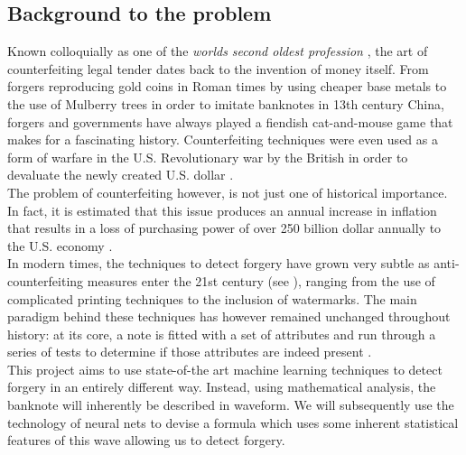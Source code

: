\documentclass[14pt]{article}
\theoremstyle{plain}
\theoremstyle{definition}
\begin{document}
\subsection{Background to the problem}
Known  colloquially as one of the \emph{worlds second oldest profession} \cite{wikiprof}, the art of counterfeiting legal tender dates back to the invention of money itself. From forgers reproducing gold coins in Roman times by using cheaper base metals \cite{wikiforge} to the use of Mulberry trees \cite{wikiforge} in order to imitate banknotes in 13th century China, forgers and governments have always played a fiendish cat-and-mouse game that makes for a fascinating history. Counterfeiting techniques were even used as a form of warfare in the U.S. Revolutionary war by the British in order to devaluate the newly created U.S. dollar \cite{wikiforge}.\\
The problem of counterfeiting however, is not just one of historical importance. In fact, it is estimated that this issue produces an annual increase in inflation that results in a loss of purchasing power of over 250 billion dollar annually to the U.S. economy \cite{usforge}.\\ 
In modern times, the techniques to detect forgery have grown very subtle as anti-counterfeiting measures enter the 21st century (see \cite{wikiforge}), ranging from the use of complicated printing techniques to the inclusion of watermarks. The main paradigm behind these techniques has however remained unchanged throughout history:  at its core, a note is fitted with a set of attributes and run through a series of tests to determine if those attributes are indeed present .\\This project aims to use state-of-the art machine learning techniques to detect forgery in an entirely different way. Instead, using mathematical analysis, the banknote will inherently be described in waveform. We will subsequently use the technology of neural nets to devise a formula which uses some inherent statistical features of this wave allowing us to detect forgery.
\end{document}
